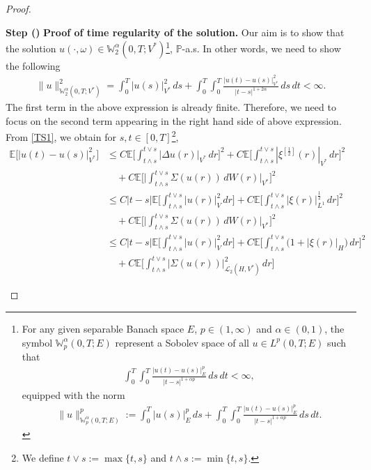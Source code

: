 \documentclass[english,a4paper,11pt]{amsart}
\theoremstyle{plain}
\theoremstyle{definition}
\theoremstyle{remark}
\numberwithin{equation}{section}
\newcounter{lil1}
\newenvironment{step}
{\begin{list} { \bf Step (\Roman{lil1})}
		{ \usecounter{lil1}
			\setlength{\leftmargin}{0.0cm}
			\setlength{\topsep}{0.2cm}
			\setlength{\itemsep}{0.0cm}
			\setlength{\parsep}{0.1cm}
			\setlength{\itemindent}{0.8cm}
			\setlength{\parskip}{0.0cm}}}
	{\end{list}}
\newcounter{lil33}
\newcounter{lil1q}
\newcommand{\EE}{ \mathbb{E} }
\renewcommand{\P}{\mathbb{P}}
\begin{document}
\begin{proof}
\begin{step}
\vspace{1mm}
\noindent
 \textbf{Proof of time regularity of the solution.} {Our aim is to show that the solution $u(\cdot,\omega)\in \mathbb{W}^{\alpha}_2(0,T;V^{\ast})$\footnote{For any given separable Banach space $E$, $p\in (1,\infty)$ and $\alpha\in (0,1)$, the symbol $\mathbb{W}^\alpha_p(0,T;E)$ represent a Sobolev space of all $u\in L^p(0,T;E)$ such that 
 	\begin{align*}
 		\int_0^T\int_0^T\frac{|u(t)-u(s)|^p_{E}}{|t-s|^{1+\alpha p}}\,ds\,dt<\infty,
 	\end{align*}
 equipped with the norm 
 \begin{align*}
 	\|u\|_{\mathbb{W}^\alpha_p(0,T;E)}^p:=\int_0^T |u(s)|_E^p\,ds+	\int_0^T\int_0^T\frac{|u(t)-u(s)|^p_{E}}{|t-s|^{1+\alpha p}}\,ds\,dt.
 \end{align*}},  $\P$-a.s. In other words, we need to show the following 
\begin{align*}
	\|u\|_{\mathbb{W}_2^\alpha(0,T;V^{\ast})}^2 = \int_0^T|u(s)|_{V^\ast}^2\, d s+\int_0^T\int_0^T \frac{|u(t)-u(s)|_{V^\ast}^2}{|t-s|^{1+2\alpha}}\, ds \, dt <\infty.
\end{align*}The first term in the above expression is already finite. Therefore, we need to focus on the second term appearing in the right hand side of above expression. From \eqref{TS1}, we obtain for $s,t\in [0,T]$\footnote{We define  $t\vee s:=\max \{t,s\}$ and $t\wedge s:=\min \{t,s\}$.}, 
\begin{align}\label{380}\nonumber
	\EE \big[|u(t)-u(s)|_{V^\ast}^2\big]  &\leq C \EE\bigg[\int_{t\wedge s}^{t\vee s} |\Delta u(r)|_{V^\ast} \, dr\bigg]^2 +C \EE\bigg[\int_{t\wedge s}^{t\vee s} |\xi^{[\frac{1}{2}]}(r)|_{V^\ast}\, dr \bigg]^2
	\\&\nonumber
	\quad + C\EE\bigg[\bigg|\int_{t\wedge s}^{t\vee s}\Sigma(u(r))\, dW(r)\bigg|_{V^\ast}\bigg]^2
	\\&\nonumber
	\leq C |t-s| \EE\bigg[\int_{t\wedge s}^{t\vee s} | u(r)|_{V}^2\, dr\bigg] +C \EE\bigg[\int_{t\wedge s}^{t\vee s} |\xi(r)|_{L^1}^\frac{1}{2}\, dr \bigg]^2
	\\&\nonumber
	\quad + C\EE\bigg[\bigg|\int_{t\wedge s}^{t\vee s}\Sigma(u(r))\, dW(r)\bigg|_{V^\ast}\bigg]^2
	\\&\nonumber
	\leq C |t-s| \EE\bigg[\int_{t\wedge s}^{t\vee s} | u(r)|_{V}^2\, dr\bigg] +C \EE\bigg[\int_{t\wedge s}^{t\vee s}\big(1+ |\xi(r)|_{H}\big)\, dr \bigg]^2
	\\&\nonumber
	\quad + C\EE\bigg[\int_{t\wedge s}^{t\vee s}|\Sigma(u(r))|_{\mathcal{L}_2(H,V^\ast)}^2\, d r\bigg]

\end{align}}
\end{step}
\end{proof}
\end{document}

